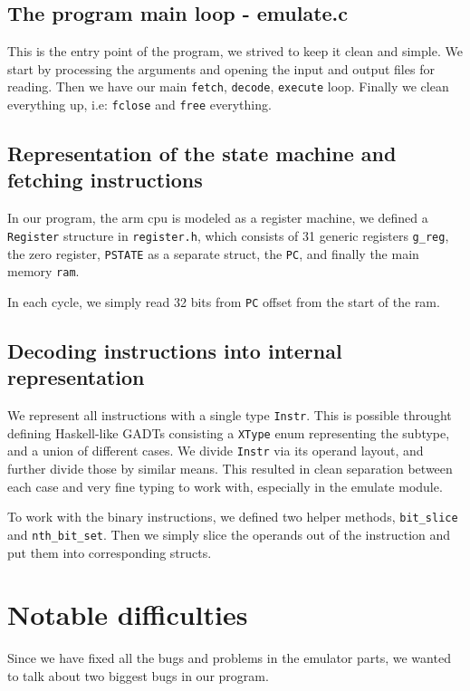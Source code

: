 \documentclass[11pt]{article}
\begin{document}
\subsection{The program main loop - emulate.c}
This is the entry point of the program, we strived to keep it clean and simple. 
We start by processing the arguments and opening the input and output files for
reading. Then we have our main \texttt{fetch}, \texttt{decode}, 
\texttt{execute} loop. Finally we clean everything up, i.e: \texttt{fclose} and
\texttt{free} everything.

\subsection{Representation of the state machine and fetching instructions}

In our program, the arm cpu is modeled as a register machine, we defined a
\texttt{Register} structure in \texttt{register.h}, which consists of 31
generic registers \texttt{g\_reg}, the zero register, \texttt{PSTATE} as a
separate struct, the \texttt{PC}, and finally the main memory \texttt{ram}.

In each cycle, we simply read 32 bits from \texttt{PC} offset from the start of
the ram.

\subsection{Decoding instructions into internal representation}

We represent all instructions with a single type \texttt{Instr}. This is 
possible throught defining Haskell-like GADTs consisting a \texttt{XType} enum
representing the subtype, and a union of different cases. We divide
\texttt{Instr} via its operand layout, and further divide those by similar 
means. This resulted in clean separation between each case and very fine typing
to work with, especially in the emulate module.

To work with the binary instructions, we defined two helper methods,
\texttt{bit\_slice} and \texttt{nth\_bit\_set}. Then we simply slice the
operands out of the instruction and put them into corresponding structs.

\section{Notable difficulties}
Since we have fixed all the bugs and problems in the emulator parts, we wanted 
to talk about two biggest bugs in our program. 
\end{document}
